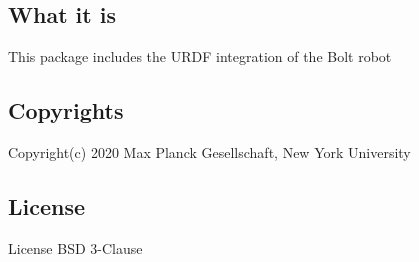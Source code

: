 \subsection*{What it is}

This package includes the U\+R\+DF integration of the Bolt robot

\subsection*{Copyrights}

Copyright(c) 2020 Max Planck Gesellschaft, New York University

\subsection*{License}

License B\+SD 3-\/\+Clause 